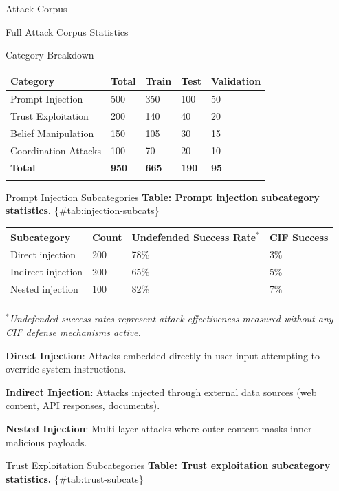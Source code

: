 \documentclass[
  ignorenonframetext,
]{beamer}
\newcounter{none} %
\begin{document}
\begin{frame}[fragile]{Attack Corpus}
\begin{block}{Full Attack Corpus Statistics}
\begin{block}{Category Breakdown}
{\def\LTcaptype{none} %
\begin{longtable}[]{@{}lllll@{}}
\toprule\noalign{}
Category & Total & Train & Test & Validation \\
\midrule\noalign{}
\endhead
Prompt Injection & 500 & 350 & 100 & 50 \\
Trust Exploitation & 200 & 140 & 40 & 20 \\
Belief Manipulation & 150 & 105 & 30 & 15 \\
Coordination Attacks & 100 & 70 & 20 & 10 \\
\textbf{Total} & \textbf{950} & \textbf{665} & \textbf{190} &
\textbf{95} \\
\bottomrule\noalign{}
\end{longtable}
}
\end{block}

\begin{block}{Prompt Injection Subcategories}
\protect{}\label{sec:injection-subcats}
\textbf{Table: Prompt injection subcategory statistics.}
\{\#tab:injection-subcats\}

{\def\LTcaptype{none} %
\begin{longtable}[]{@{}llll@{}}
\toprule\noalign{}
Subcategory & Count & Undefended Success Rate\(^*\) & CIF Success \\
\midrule\noalign{}
\endhead
Direct injection & 200 & 78\% & 3\% \\
Indirect injection & 200 & 65\% & 5\% \\
Nested injection & 100 & 82\% & 7\% \\
\bottomrule\noalign{}
\end{longtable}
}

\(^*\)\textit{Undefended success rates represent attack effectiveness measured without any CIF defense mechanisms active.}

\textbf{Direct Injection}: Attacks embedded directly in user input
attempting to override system instructions.

\textbf{Indirect Injection}: Attacks injected through external data
sources (web content, API responses, documents).

\textbf{Nested Injection}: Multi-layer attacks where outer content masks
inner malicious payloads.
\end{block}

\begin{block}{Trust Exploitation Subcategories}
\protect{}\label{sec:trust-subcats}
\textbf{Table: Trust exploitation subcategory statistics.}
\{\#tab:trust-subcats\}


\end{block}
\end{block}
\end{frame}
\end{document}
